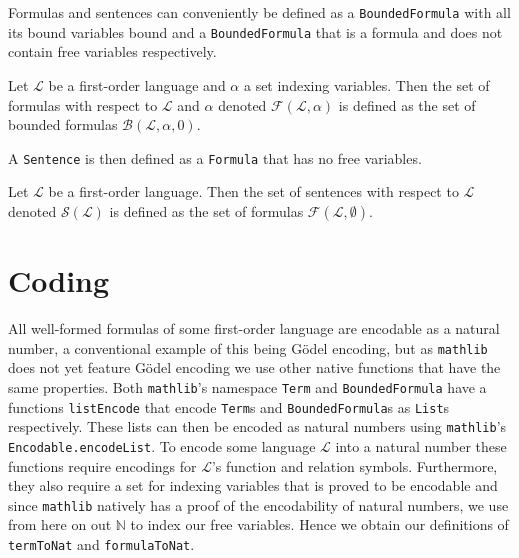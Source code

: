 Formulas and sentences can conveniently be defined as a \texttt{BoundedFormula} with all its bound variables bound and a \texttt{BoundedFormula} that is a formula and does not contain free variables respectively.

\begin{definition}\label{def:FO-Formula}
  \leanok
    Let $\mathcal{L}$ be a first-order language and $\alpha$ a set indexing variables. Then the set of formulas with respect to $\mathcal{L}$ and $\alpha$ denoted $\mathcal{F}(\mathcal{L},\alpha)$ is defined as the set of bounded formulas $\mathcal{B}(\mathcal{L},\alpha,0)$.
\end{definition}

A \texttt{Sentence} is then defined as a \texttt{Formula} that has no free variables.

\begin{definition}\label{def:FO-Sentence}
  \leanok
    Let $\mathcal{L}$ be a first-order language. Then the set of sentences with respect to $\mathcal{L}$ denoted $\mathcal{S}(\mathcal{L})$ is defined as the set of formulas $\mathcal{F}(\mathcal{L},\emptyset)$.
\end{definition}

\section{Coding}\label{subsec:coding}
All well-formed formulas of some first-order language are encodable as a natural number, a conventional example of this being Gödel encoding, but as \texttt{mathlib} does not yet feature Gödel encoding we use other native functions that have the same properties. Both \texttt{mathlib}'s namespace \texttt{Term} and \texttt{BoundedFormula} have a functions \texttt{listEncode} that encode \texttt{Term}s and \texttt{BoundedFormula}s as \texttt{List}s respectively. These lists can then be encoded as natural numbers using \texttt{mathlib}'s \texttt{Encodable.encodeList}. To encode some language $\mathcal{L}$ into a natural number these functions require encodings for $\mathcal{L}$'s function and relation symbols. Furthermore, they also require a set for indexing variables that is proved to be encodable and since \texttt{mathlib} natively has a proof of the encodability of natural numbers, we use from here on out $\mathbb{N}$ to index our free variables. Hence we obtain our definitions of \texttt{termToNat} and \texttt{formulaToNat}.

